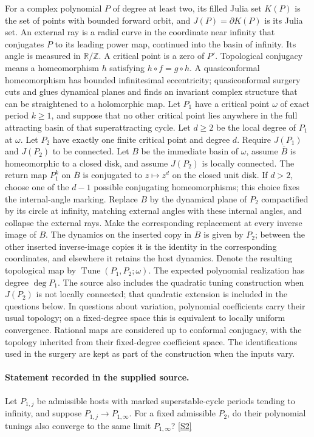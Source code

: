 \documentclass[11pt]{article}
\newcommand{\sref}[2]{\hyperlink{source:#1:#2}{[S#2]}}
\begin{document}
For a complex polynomial $P$ of degree at least two, its filled Julia set $K(P)$ is the set of points with bounded forward orbit, and $J(P)=\partial K(P)$ is its Julia set. An external ray is a radial curve in the coordinate near infinity that conjugates $P$ to its leading power map, continued into the basin of infinity. Its angle is measured in $\mathbb R/\mathbb Z$. A critical point is a zero of $P'$. Topological conjugacy means a homeomorphism $h$ satisfying $h\circ f=g\circ h$. A quasiconformal homeomorphism has bounded infinitesimal eccentricity; quasiconformal surgery cuts and glues dynamical planes and finds an invariant complex structure that can be straightened to a holomorphic map.
Let $P_1$ have a critical point $\omega$ of exact period $k\geq1$, and suppose that no other critical point lies anywhere in the full attracting basin of that superattracting cycle. Let $d\geq2$ be the local degree of $P_1$ at $\omega$. Let $P_2$ have exactly one finite critical point and degree $d$. Require $J(P_1)$ and $J(P_2)$ to be connected. Let $B$ be the immediate basin of $\omega$, assume $\overline B$ is homeomorphic to a closed disk, and assume $J(P_2)$ is locally connected. The return map $P_1^k$ on $\overline B$ is conjugated to $z\mapsto z^d$ on the closed unit disk. If $d>2$, choose one of the $d-1$ possible conjugating homeomorphisms; this choice fixes the internal-angle marking.
Replace $B$ by the dynamical plane of $P_2$ compactified by its circle at infinity, matching external angles with these internal angles, and collapse the external rays. Make the corresponding replacement at every inverse image of $B$. The dynamics on the inserted copy in $B$ is given by $P_2$; between the other inserted inverse-image copies it is the identity in the corresponding coordinates, and elsewhere it retains the host dynamics. Denote the resulting topological map by $\operatorname{Tune}(P_1,P_2;\omega)$. The expected polynomial realization has degree $\deg P_1$. The source also includes the quadratic tuning construction when $J(P_2)$ is not locally connected; that quadratic extension is included in the questions below.
In questions about variation, polynomial coefficients carry their usual topology; on a fixed-degree space this is equivalent to locally uniform convergence. Rational maps are considered up to conformal conjugacy, with the topology inherited from their fixed-degree coefficient space. The identifications used in the surgery are kept as part of the construction when the inputs vary.
\paragraph{Statement recorded in the supplied source.}
Let $P_{1,j}$ be admissible hosts with marked superstable-cycle periods tending to infinity, and suppose $P_{1,j}\to P_{1,\infty}$. For a fixed admissible $P_2$, do their polynomial tunings also converge to the same limit $P_{1,\infty}$? \sref{5300008}{2}
\end{document}
